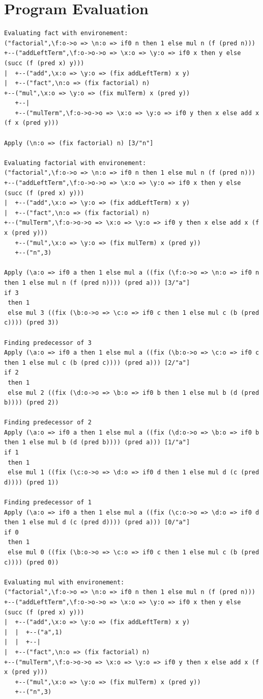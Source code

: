 \documentclass[12pt,a4paper]{report}
\theoremstyle{definition}
\theoremstyle{definition}
\theoremstyle{remark}
\begin{document}
\section{Program Evaluation}
\begin{verbatim}
Evaluating fact with environement:
("factorial",\f:o->o => \n:o => if0 n then 1 else mul n (f (pred n)))
+--("addLeftTerm",\f:o->o->o => \x:o => \y:o => if0 x then y else (succ (f (pred x) y)))
|  +--("add",\x:o => \y:o => (fix addLeftTerm) x y)
|  +--("fact",\n:o => (fix factorial) n)
+--("mul",\x:o => \y:o => (fix mulTerm) x (pred y))
   +--|
   +--("mulTerm",\f:o->o->o => \x:o => \y:o => if0 y then x else add x (f x (pred y)))

Apply (\n:o => (fix factorial) n) [3/"n"] 

Evaluating factorial with environement:
("factorial",\f:o->o => \n:o => if0 n then 1 else mul n (f (pred n)))
+--("addLeftTerm",\f:o->o->o => \x:o => \y:o => if0 x then y else (succ (f (pred x) y)))
|  +--("add",\x:o => \y:o => (fix addLeftTerm) x y)
|  +--("fact",\n:o => (fix factorial) n)
+--("mulTerm",\f:o->o->o => \x:o => \y:o => if0 y then x else add x (f x (pred y)))
   +--("mul",\x:o => \y:o => (fix mulTerm) x (pred y))
   +--("n",3)

Apply (\a:o => if0 a then 1 else mul a ((fix (\f:o->o => \n:o => if0 n then 1 else mul n (f (pred n)))) (pred a))) [3/"a"] 
if 3
 then 1
 else mul 3 ((fix (\b:o->o => \c:o => if0 c then 1 else mul c (b (pred c)))) (pred 3))

Finding predecessor of 3
Apply (\a:o => if0 a then 1 else mul a ((fix (\b:o->o => \c:o => if0 c then 1 else mul c (b (pred c)))) (pred a))) [2/"a"] 
if 2
 then 1
 else mul 2 ((fix (\d:o->o => \b:o => if0 b then 1 else mul b (d (pred b)))) (pred 2))

Finding predecessor of 2
Apply (\a:o => if0 a then 1 else mul a ((fix (\d:o->o => \b:o => if0 b then 1 else mul b (d (pred b)))) (pred a))) [1/"a"] 
if 1
 then 1
 else mul 1 ((fix (\c:o->o => \d:o => if0 d then 1 else mul d (c (pred d)))) (pred 1))

Finding predecessor of 1
Apply (\a:o => if0 a then 1 else mul a ((fix (\c:o->o => \d:o => if0 d then 1 else mul d (c (pred d)))) (pred a))) [0/"a"] 
if 0
 then 1
 else mul 0 ((fix (\b:o->o => \c:o => if0 c then 1 else mul c (b (pred c)))) (pred 0))

Evaluating mul with environement:
("factorial",\f:o->o => \n:o => if0 n then 1 else mul n (f (pred n)))
+--("addLeftTerm",\f:o->o->o => \x:o => \y:o => if0 x then y else (succ (f (pred x) y)))
|  +--("add",\x:o => \y:o => (fix addLeftTerm) x y)
|  |  +--("a",1)
|  |  +--|
|  +--("fact",\n:o => (fix factorial) n)
+--("mulTerm",\f:o->o->o => \x:o => \y:o => if0 y then x else add x (f x (pred y)))
   +--("mul",\x:o => \y:o => (fix mulTerm) x (pred y))
   +--("n",3)


\end{verbatim}
\end{document}
